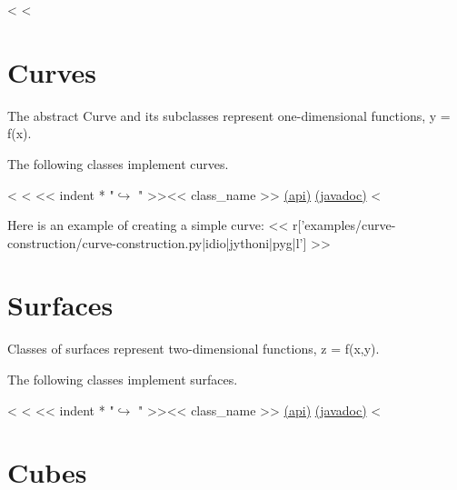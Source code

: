 <%
<%

\section{Curves}

The abstract Curve and its subclasses represent one-dimensional functions, y = f(x).

The following classes implement curves.

\begin{fullwidth}
<%
<%
<< indent * "$\hookrightarrow$ " >><< class_name >> \href{http://docs-static.opengamma.com/<< OG_VERSION >>/analytics/api/<< package_name >>.html#class-<<class_name>>}{(api)} \href{http://docs-static.opengamma.com/<< OG_VERSION >>/java/javadocs/<< class_name.replace(".","/") >>.html}{(javadoc)}
<%
\end{fullwidth}

Here is an example of creating a simple curve:
<< r['examples/curve-construction/curve-construction.py|idio|jythoni|pyg|l'] >>

\section{Surfaces}

Classes of surfaces represent two-dimensional functions, z = f(x,y).

The following classes implement surfaces.

\begin{fullwidth}
<%
<%
<< indent * "$\hookrightarrow$ " >><< class_name >> \href{http://docs-static.opengamma.com/<< OG_VERSION >>/analytics/api/<< package_name >>.html#class-<<class_name>>}{(api)} \href{http://docs-static.opengamma.com/<< OG_VERSION >>/java/javadocs/<< class_name.replace(".","/") >>.html}{(javadoc)}
<%
\end{fullwidth}

\section{Cubes}

